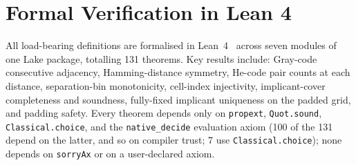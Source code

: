 \section{Formal Verification in Lean 4}
\label{sec:theory-lean}

All load-bearing definitions are formalised in Lean~4~\cite{lean4} across seven
modules of one Lake package, totalling 131 theorems.  Key results include: Gray-code consecutive
adjacency, Hamming-distance symmetry, He-code pair counts at each distance,
separation-bin monotonicity, cell-index injectivity, implicant-cover
completeness and soundness, fully-fixed implicant uniqueness on the padded
grid, and padding safety.  Every theorem depends only on \texttt{propext},
\texttt{Quot.sound}, \texttt{Classical.choice}, and the
\texttt{native\_decide} evaluation axiom (100 of the 131 depend on the
latter, and so on compiler trust; 7 use \texttt{Classical.choice}); none
depends on \texttt{sorryAx} or on a user-declared axiom.
